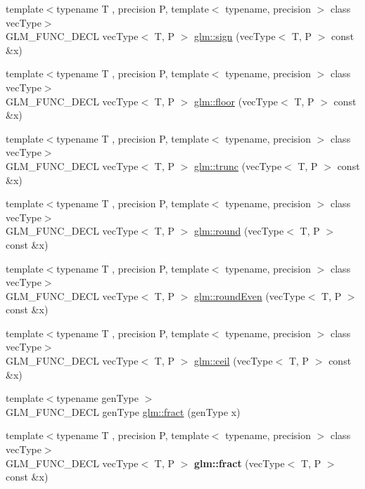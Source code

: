 \begin{DoxyCompactItemize}
\item 
{\footnotesize template$<$typename T , precision P, template$<$ typename, precision $>$ class vec\-Type$>$ }\\G\-L\-M\-\_\-\-F\-U\-N\-C\-\_\-\-D\-E\-C\-L vec\-Type$<$ T, P $>$ \hyperlink{group__core__func__common_gac3446b4138e0b8757561c07cd19f084d}{glm\-::sign} (vec\-Type$<$ T, P $>$ const \&x)
\item 
{\footnotesize template$<$typename T , precision P, template$<$ typename, precision $>$ class vec\-Type$>$ }\\G\-L\-M\-\_\-\-F\-U\-N\-C\-\_\-\-D\-E\-C\-L vec\-Type$<$ T, P $>$ \hyperlink{group__core__func__common_ga568b822b78f045f77c3325e165b44d5d}{glm\-::floor} (vec\-Type$<$ T, P $>$ const \&x)
\item 
{\footnotesize template$<$typename T , precision P, template$<$ typename, precision $>$ class vec\-Type$>$ }\\G\-L\-M\-\_\-\-F\-U\-N\-C\-\_\-\-D\-E\-C\-L vec\-Type$<$ T, P $>$ \hyperlink{group__core__func__common_ga634cdbf8b37edca03f2248450570fd54}{glm\-::trunc} (vec\-Type$<$ T, P $>$ const \&x)
\item 
{\footnotesize template$<$typename T , precision P, template$<$ typename, precision $>$ class vec\-Type$>$ }\\G\-L\-M\-\_\-\-F\-U\-N\-C\-\_\-\-D\-E\-C\-L vec\-Type$<$ T, P $>$ \hyperlink{group__core__func__common_gada0165544c0618d634c8056a88082ce9}{glm\-::round} (vec\-Type$<$ T, P $>$ const \&x)
\item 
{\footnotesize template$<$typename T , precision P, template$<$ typename, precision $>$ class vec\-Type$>$ }\\G\-L\-M\-\_\-\-F\-U\-N\-C\-\_\-\-D\-E\-C\-L vec\-Type$<$ T, P $>$ \hyperlink{group__core__func__common_ga655598104195a60a950291485e84a97e}{glm\-::round\-Even} (vec\-Type$<$ T, P $>$ const \&x)
\item 
{\footnotesize template$<$typename T , precision P, template$<$ typename, precision $>$ class vec\-Type$>$ }\\G\-L\-M\-\_\-\-F\-U\-N\-C\-\_\-\-D\-E\-C\-L vec\-Type$<$ T, P $>$ \hyperlink{group__core__func__common_ga9189b2bec45ff301923ea8f8dd157fb8}{glm\-::ceil} (vec\-Type$<$ T, P $>$ const \&x)
\item 
{\footnotesize template$<$typename gen\-Type $>$ }\\G\-L\-M\-\_\-\-F\-U\-N\-C\-\_\-\-D\-E\-C\-L gen\-Type \hyperlink{group__core__func__common_ga8ba89e40e55ae5cdf228548f9b7639c7}{glm\-::fract} (gen\-Type x)
\item 
\hypertarget{group__core__func__common_ga950ab967a4406f596b7c6c14af091874}{{\footnotesize template$<$typename T , precision P, template$<$ typename, precision $>$ class vec\-Type$>$ }\\G\-L\-M\-\_\-\-F\-U\-N\-C\-\_\-\-D\-E\-C\-L vec\-Type$<$ T, P $>$ {\bfseries glm\-::fract} (vec\-Type$<$ T, P $>$ const \&x)}\label{group__core__func__common_ga950ab967a4406f596b7c6c14af091874}


\end{DoxyCompactItemize}
